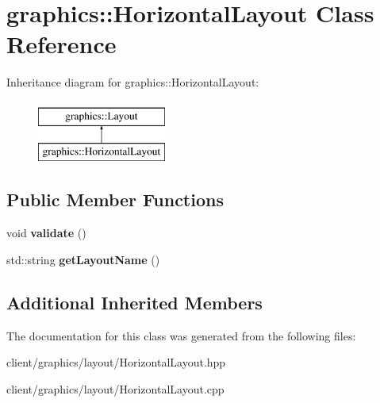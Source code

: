 \hypertarget{classgraphics_1_1_horizontal_layout}{\section{graphics\-:\-:Horizontal\-Layout Class Reference}
\label{classgraphics_1_1_horizontal_layout}
}
Inheritance diagram for graphics\-:\-:Horizontal\-Layout\-:\begin{figure}[H]
\begin{center}
\leavevmode
\includegraphics[height=2.000000cm]{classgraphics_1_1_horizontal_layout}
\end{center}
\end{figure}
\subsection*{Public Member Functions}
\begin{DoxyCompactItemize}
\item 
\hypertarget{classgraphics_1_1_horizontal_layout_a226c420cefbbc9271b7cfefc6038d4ce}{void {\bfseries validate} ()}\label{classgraphics_1_1_horizontal_layout_a226c420cefbbc9271b7cfefc6038d4ce}

\item 
\hypertarget{classgraphics_1_1_horizontal_layout_a8f1753afb0b648066cbdea7897b06ad2}{std\-::string {\bfseries get\-Layout\-Name} ()}\label{classgraphics_1_1_horizontal_layout_a8f1753afb0b648066cbdea7897b06ad2}

\end{DoxyCompactItemize}
\subsection*{Additional Inherited Members}


The documentation for this class was generated from the following files\-:\begin{DoxyCompactItemize}
\item 
client/graphics/layout/Horizontal\-Layout.\-hpp\item 
client/graphics/layout/Horizontal\-Layout.\-cpp\end{DoxyCompactItemize}
